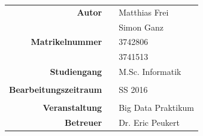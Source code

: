 \begin{titlepage}
\begin{center}
\begin{flushbottom}
\begin{tabular}{r|rl}
\textbf{Autor} & & Matthias Frei\\ & & Simon Ganz\\
\textbf{Matrikelnummer} & & 3742806\\ & & 3741513\\
\textbf{Studiengang} & & M.Sc. Informatik\\
 & & \\
\textbf{Bearbeitungszeitraum} & & SS 2016\\
 & & \\\textbf{Veranstaltung} & & Big Data Praktikum\\
\textbf{Betreuer} & & Dr. Eric Peukert\\
\end{tabular}
\end{flushbottom}


\end{center}
\end{titlepage}

\restoregeometry
